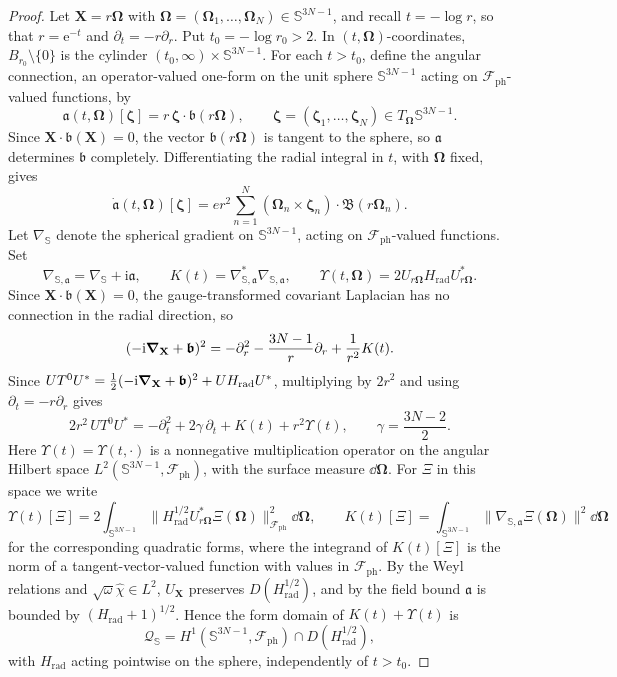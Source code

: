 \documentclass[final,reqno]{amsart}
\theoremstyle{remark}
\renewcommand{\i}{\mathrm{i}}
\newcommand{\e}{\mathrm{e}}
\newcommand{\DC}{D}
\newcommand{\BF}{\bm{\mathfrak{B}}}
\newcommand{\vbf}{\bm{\mathfrak{b}}}
\newcommand{\ph}{\mathrm{ph}}
\newcommand{\rad}{\mathrm{rad}}
\newcommand{\Fock}{\mathcal{F}}
\newcommand{\vzeta}{{\bm{\zeta}}}
\newcommand{\vOmega}{{\bm{\Omega}}}
\newcommand{\vX}{{\mathbf{X}}}
\newcommand{\wh}[1]{\widehat{#1}}
\begin{document}
\begin{proof}
Let $\vX=r\vOmega$ with $\vOmega=(\vOmega_1,\ldots,\vOmega_N)\in\mathbb S^{3N-1}$, and recall
$t=-\log r$, so that $r=\e^{-t}$ and $\partial_t=-r\partial_r$.  Put
$t_0=-\log r_0>2$.  In $(t,\vOmega)$-coordinates,
$B_{r_0}\setminus\{0\}$ is the cylinder
$(t_0,\infty)\times\mathbb S^{3N-1}$.  For each $t>t_0$,
define the angular connection, an operator-valued one-form on the unit
sphere $\mathbb S^{3N-1}$ acting on $\Fock_\ph$-valued functions, by
\[
 \mathfrak a(t,\vOmega)[\vzeta]=r\,\vzeta\cdot\vbf(r\vOmega),
 \qquad \vzeta=(\vzeta_1,\ldots,\vzeta_N)\in T_\vOmega\mathbb S^{3N-1}.
\]
Since $\vX\cdot\vbf(\vX)=0$, the vector $\vbf(r\vOmega)$ is tangent to the
sphere, so $\mathfrak a$ determines $\vbf$ completely.
Differentiating the radial integral in $t$, with $\vOmega$ fixed, gives
\begin{equation}\label{pf-angular-derivative}
 \dot{\mathfrak a}(t,\vOmega)[\vzeta]
 =er^2\sum_{n=1}^N(\vOmega_n\times\vzeta_n)\cdot\BF(r\vOmega_n).
\end{equation}
Let $\nabla_{\mathbb S}$ denote the spherical gradient on
$\mathbb S^{3N-1}$, acting on $\Fock_\ph$-valued functions.  Set
\[
 \nabla_{\mathbb S,\mathfrak a}
       =\nabla_{\mathbb S}+\i\mathfrak a,
 \qquad K(t)=\nabla_{\mathbb S,\mathfrak a}^*
                         \nabla_{\mathbb S,\mathfrak a},
 \qquad
 \Upsilon(t,\vOmega)=2U_{r\vOmega}H_\rad U_{r\vOmega}^*.
\]
Since $\vX\cdot\vbf(\vX)=0$, the gauge-transformed covariant Laplacian has
no connection in the radial direction, so
\[
 (-\i\grad_{\vX}+\vbf)^2
 =-\partial_r^2-\frac{3N-1}{r}\partial_r+\frac{1}{r^2}K(t).
\]
Since $UT^0U^*=\frac12(-\i\grad_\vX+\vbf)^2+UH_\rad U^*$, multiplying
by $2r^2$ and using $\partial_t=-r\partial_r$ gives
\begin{equation}\label{pf-polar-form}
 2r^2\,UT^0U^*=-\partial_t^2+2\gamma\,\partial_t+K(t)+r^2\Upsilon(t),
 \qquad \gamma=\frac{3N-2}{2}.
\end{equation}
Here $\Upsilon(t)=\Upsilon(t,\cdot)$ is a nonnegative multiplication operator on the angular
Hilbert space $L^2(\mathbb S^{3N-1},\Fock_\ph)$, with the surface
measure $\dd\vOmega$.  For $\Xi$ in this space we write
\[
 \Upsilon(t)[\Xi]=2\int_{\mathbb S^{3N-1}}
   \|H_\rad^{1/2}U_{r\vOmega}^*\Xi(\vOmega)\|_{\Fock_\ph}^2\dd\vOmega,
 \qquad
 K(t)[\Xi]=\int_{\mathbb S^{3N-1}}
   \|\nabla_{\mathbb S,\mathfrak a}\Xi(\vOmega)\|^2\dd\vOmega
\]
for the corresponding quadratic forms, where the integrand of $K(t)[\Xi]$
is the norm of a tangent-vector-valued function with values in
$\Fock_\ph$.  By the Weyl relations and $\sqrt\omega\wh\chi\in L^2$,
$U_\vX$ preserves $\DC(H_\rad^{1/2})$, and by the field bound
$\mathfrak a$ is bounded by $(H_\rad+1)^{1/2}$.  Hence the form domain
of $K(t)+\Upsilon(t)$ is
\[
 \mathcal Q_{\mathbb S}
 =H^1(\mathbb S^{3N-1},\Fock_\ph)\cap\DC(H_\rad^{1/2}),
\]
with $H_\rad$ acting pointwise on the sphere, independently of $t>t_0$.


\end{proof}
\end{document}
